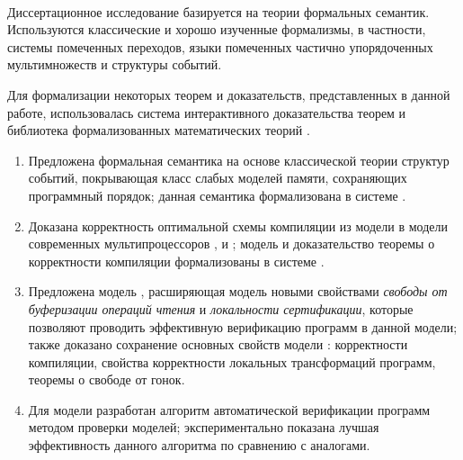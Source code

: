 ~\newline

{\methods}

Диссертационное исследование базируется на теории формальных семантик. 
Используются классические и хорошо изученные формализмы, в частности, 
системы помеченных переходов, языки помеченных частично упорядоченных мультимножеств и структуры событий. 

Для формализации некоторых теорем и доказательств, представленных в данной работе, 
использовалась система интерактивного доказательства теорем \coq 
и библиотека формализованных математических теорий \mathcomp.


{}
\begin{enumerate}[beginpenalty=10000] %
  \item Предложена формальная семантика на основе классической теории структур событий, 
    покрывающая класс слабых моделей памяти, сохраняющих программный порядок;
    данная семантика формализована в системе \coq.
  \item Доказана корректность оптимальной схемы компиляции из модели \Wkm
    в модели современных мультипроцессоров \TSO, \ARM и \POWER;
    модель \Wkm и доказательство теоремы о корректности компиляции
    формализованы в системе \coq.
  \item Предложена модель \WkmS, расширяющая модель \Wkm 
  новыми свойствами \emph{свободы от буферизации
  операций чтения} и \emph{локальности сертификации}, 
  которые позволяют проводить эффективную верификацию программ в данной модели;
  также доказано сохранение основных свойств модели \Wkm: корректности компиляции,
  свойства корректности локальных трансформаций программ,
  теоремы о свободе от гонок.
  \item Для модели \WkmS разработан алгоритм автоматической 
    верификации программ методом проверки моделей; 
    экспериментально показана лучшая эффективность 
    данного алгоритма по сравнению с аналогами.
\end{enumerate}

